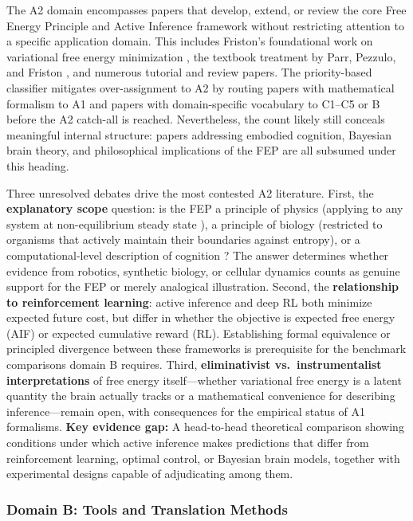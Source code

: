 \documentclass[
  english,
]{article}
\begin{document}
The A2 domain encompasses papers that develop, extend, or review the
core Free Energy Principle and Active Inference framework without
restricting attention to a specific application domain. This includes
Friston's foundational work on variational free energy minimization
\citep{friston2010free}, the textbook treatment by Parr, Pezzulo, and
Friston \citep{parr2022active}, and numerous tutorial and review papers.
The priority-based classifier mitigates over-assignment to A2 by routing
papers with mathematical formalism to A1 and papers with domain-specific
vocabulary to C1--C5 or B before the A2 catch-all is reached.
Nevertheless, the count likely still conceals meaningful internal
structure: papers addressing embodied cognition, Bayesian brain theory,
and philosophical implications of the FEP are all subsumed under this
heading.

Three unresolved debates drive the most contested A2 literature. First,
the \textbf{explanatory scope} question: is the FEP a principle of
physics (applying to any system at non-equilibrium steady state
\citep{friston2010free}), a principle of biology (restricted to
organisms that actively maintain their boundaries against entropy), or a
computational-level description of cognition \citep{clark2013whatever}?
The answer determines whether evidence from robotics, synthetic biology,
or cellular dynamics counts as genuine support for the FEP or merely
analogical illustration. Second, the \textbf{relationship to
reinforcement learning}: active inference and deep RL both minimize
expected future cost, but differ in whether the objective is expected
free energy (AIF) or expected cumulative reward (RL). Establishing
formal equivalence or principled divergence between these frameworks is
prerequisite for the benchmark comparisons domain B requires. Third,
\textbf{eliminativist vs.~instrumentalist interpretations} of free
energy itself---whether variational free energy is a latent quantity the
brain actually tracks or a mathematical convenience for describing
inference---remain open, with consequences for the empirical status of
A1 formalisms. \textbf{Key evidence gap:} A head-to-head theoretical
comparison showing conditions under which active inference makes
predictions that differ from reinforcement learning, optimal control, or
Bayesian brain models, together with experimental designs capable of
adjudicating among them.

\subsubsection{Domain B: Tools and Translation
Methods}\label{domain-b-tools-and-translation-methods}
\end{document}
